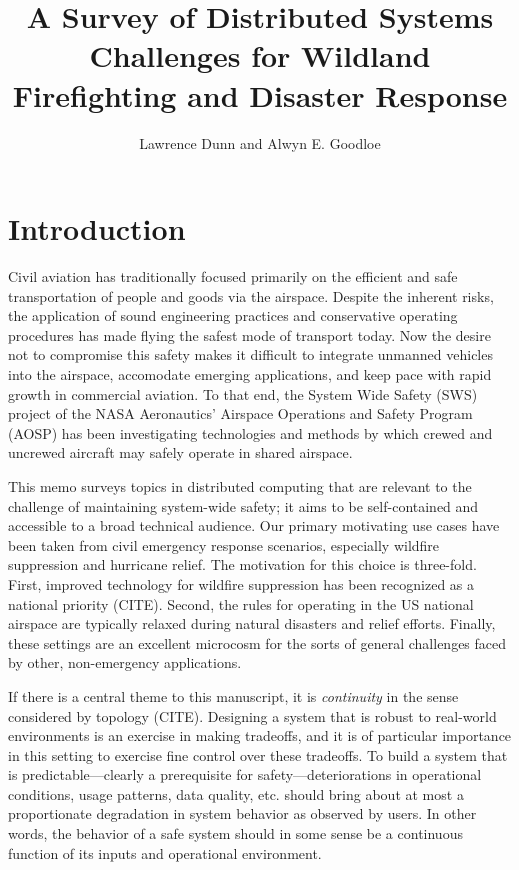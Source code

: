 \documentclass[]             %
{NASA}                       %
\title{A Survey of Distributed Systems Challenges for Wildland
Firefighting and Disaster Response}
\author{Lawrence Dunn and Alwyn E. Goodloe}
\theoremstyle{definition}
\begin{document}
\newpage
\setcounter{tocdepth}{2}
\tableofcontents
\newpage

\section{Introduction}\label{introduction}

Civil aviation has traditionally focused primarily on the efficient and
safe transportation of people and goods via the airspace. Despite the
inherent risks, the application of sound engineering practices and
conservative operating procedures has made flying the safest mode of
transport today. Now the desire not to compromise this safety makes it
difficult to integrate unmanned vehicles into the airspace, accomodate
emerging applications, and keep pace with rapid growth in commercial
aviation. To that end, the System Wide Safety (SWS) project of the NASA
Aeronautics' Airspace Operations and Safety Program (AOSP) has been
investigating technologies and methods by which crewed and uncrewed
aircraft may safely operate in shared airspace.

This memo surveys topics in distributed computing that are relevant to
the \mbox{challenge} of maintaining system-wide safety; it aims to be
self-contained and accessible to a broad technical audience. Our primary
motivating use cases have been taken from civil emergency response
scenarios, especially wildfire suppression and hurricane relief. The
motivation for this choice is three-fold. First, improved technology for
wildfire suppression has been recognized as a national priority (CITE).
Second, the rules for operating in the US national airspace are
typically relaxed during natural disasters and relief efforts. Finally,
these settings are an excellent microcosm for the sorts of general
challenges faced by other, non-emergency applications.

If there is a central theme to this manuscript, it is \emph{continuity}
in the sense considered by topology (CITE). Designing a system that is
robust to real-world environments is an exercise in making tradeoffs,
and it is of particular importance in this setting to exercise fine
control over these tradeoffs. To build a system that is
predictable---clearly a prerequisite for safety---deteriorations in
operational conditions, usage patterns, data quality, etc. should bring
about at most a proportionate degradation in system behavior as observed
by users. In other words, the behavior of a safe system should in some
sense be a continuous function of its inputs and operational
environment.
\end{document}
